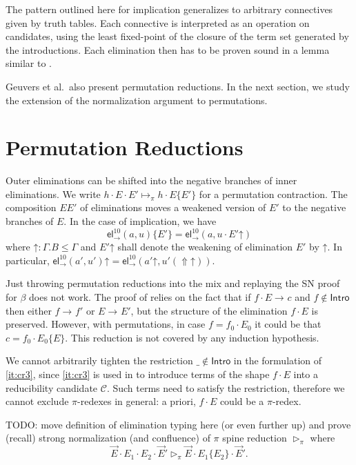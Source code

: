 \documentclass[a4paper,USenglish,cleveref, autoref, thm-restate]{lipics-v2019}
\newcommand{\tel}{\mathsf{el}}
\newcommand{\el}[2]{\ensuremath{\tel_{#1}^{#2}}}
\newcommand{\contract}[1][]{\mapsto_{#1}}
\newcommand{\whd}[1][]{\rhd_{#1}}
\newcommand{\red}[1][]{\longrightarrow_{#1}}
\newcommand{\C}{\mathcal{C}}
\newcommand{\Intro}{\mathsf{Intro}}
\newcommand{\Up}{\mathop{\Uparrow}}
\newcommand{\up}{\mathord{\uparrow}}
\begin{document}
The pattern outlined here for implication generalizes to arbitrary
connectives given by truth tables.  Each connective is interpreted as
an operation on candidates, using the least fixed-point of the closure
of the term set generated by the introductions.  Each elimination then
has to be proven sound in a lemma similar to .

Geuvers et al.\ also present permutation reductions.  In the next
section, we study the extension of the normalization argument to
permutations.

\section{Permutation Reductions}
\label{sec:perm}

Outer eliminations can be shifted into the negative branches of inner
eliminations.  We write
$h \cdot E \cdot E' \contract[\pi] h \cdot E\{E'\}$ for a permutation
contraction.  The composition $E{E'}$ of eliminations moves a weakened
version of $E'$ to the negative branches of $E$.  In the case of
implication, we have
\[
  \el\to{10}(a,u) \{ E' \} = \el\to{10}(a,u \cdot E' \up)
\]
where $\up : \Gamma.B \leq \Gamma$ and
$E' \up$ shall denote the weakening of elimination $E'$ by $\up$.
In particular, $\el\to{10}(a',u') \up = \el\to{10}(a' \up, u' (\Up\up))$.

Just throwing permutation reductions into the mix and replaying the SN
proof for $\beta$ does not work.  The proof of  relies
on the fact that if $f \cdot E \red c$ and $f \not\in \Intro$ then
either $f \red f'$ or $E \red E'$, but the structure of the
elimination $f \cdot E$ is preserved.  However, with permutations, in
case $f = f_0 \cdot E_0$ it could be that $c = f_0 \cdot E_0\{E\}$.
This reduction is not covered by any induction hypothesis.

We cannot arbitrarily tighten the restriction $\_ \not\in \Intro$ in
the formulation of \ref{it:cr3}, since \ref{it:cr3} is used in  to
introduce terms of the shape $f \cdot E$
into a reducibility candidate $\C$.  Such terms need to satisfy the
restriction, therefore we cannot exclude $\pi$-redexes in general: a
priori, $f \cdot E$ could be a $\pi$-redex.

TODO: move definition of elimination typing here (or even further up) and
prove (recall) strong normalization (and confluence) of $\pi$ spine
reduction $\whd[\pi]$ where
\[
  \vec E \cdot E_1 \cdot E_2 \cdot \vec E'
  \whd[\pi]
 \vec E \cdot E_1\{E_2\} \cdot \vec E'
 .
\]
\end{document}
